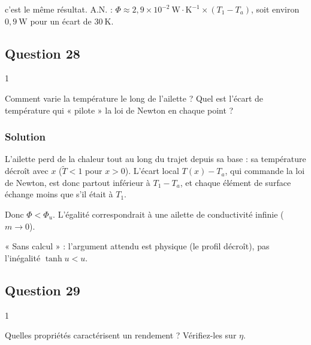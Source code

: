 \documentclass[11pt,a4paper]{article}
\newcommand{\equationajustee}[1]{%
  \sbox{\boiteequation}{$\displaystyle #1$}%
  \ifdim\wd\boiteequation>\linewidth
    \[\resizebox{\linewidth}{!}{\usebox{\boiteequation}}\]%
  \else
    \[#1\]%
  \fi}
\begin{document}
\equationajustee{\int_0^\ell2hL\,\theta\,\mathrm{d}x=\frac{2hL(T_1-T_a)}{\cosh(m\ell)}\cdot\frac{\sinh(m\ell)}{m}}

c'est le même résultat. A.N. : \(\Phi\approx2{,}9\times10^{-2}\ \mathrm{W\cdot K^{-1}}\times(T_1-T_a)\), soit environ \(0{,}9\ \mathrm{W}\) pour un écart de \(30\ \mathrm{K}\).

\hypertarget{question-28}{%
\subsection{Question 28}\label{question-28}}

\begin{indication}{1}

Comment varie la température le long de l'ailette ? Quel est l'écart de température qui « pilote » la loi de Newton en chaque point ?

\end{indication}

\hypertarget{solution-27}{%
\subsubsection{Solution}\label{solution-27}}

L'ailette perd de la chaleur tout au long du trajet depuis sa base : sa température décroît avec \(x\) (\(\widetilde T<1\) pour \(x>0\)). L'écart local \(T(x)-T_a\), qui commande la loi de Newton, est donc partout inférieur à \(T_1-T_a\), et chaque élément de surface échange moins que s'il était à \(T_1\).

Donc \(\boxed{\Phi<\Phi_u}\). L'égalité correspondrait à une ailette de conductivité infinie (\(m\to0\)).

\begin{piege}

« Sans calcul » : l'argument attendu est physique (le profil décroît), pas l'inégalité \(\tanh u<u\).

\end{piege}

\hypertarget{question-29}{%
\subsection{Question 29}\label{question-29}}

\begin{indication}{1}

Quelles propriétés caractérisent un rendement ? Vérifiez-les sur \(\eta\).

\end{indication}
\end{document}
